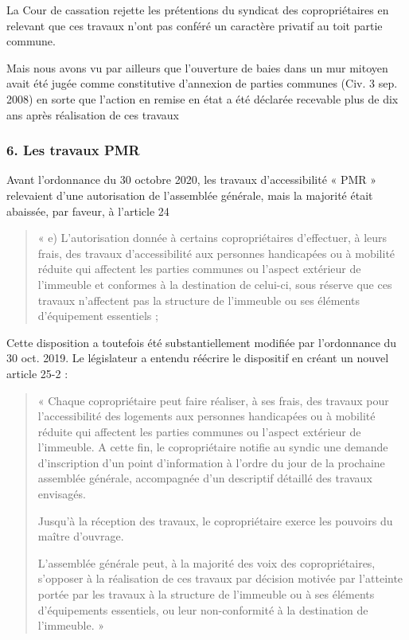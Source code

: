 				La Cour de cassation rejette les prétentions du syndicat des copropriétaires en relevant que ces travaux n’ont pas conféré un caractère privatif au toit partie commune.
				
				Mais nous avons vu par ailleurs que l’ouverture de baies dans un mur mitoyen avait été jugée comme constitutive d’annexion de parties communes (Civ. 3 sep. 2008) en sorte que l’action en remise en état a été déclarée recevable plus de dix ans après réalisation de ces travaux

		
		\subsubsection{6. Les travaux PMR}
		
			Avant l’ordonnance du 30 octobre 2020, les travaux d’accessibilité « PMR » relevaient d’une autorisation de l’assemblée générale, mais la majorité était abaissée, par faveur, à l’article 24
			\begin{quote}
				« e) L’autorisation donnée à certains copropriétaires d’effectuer, à leurs frais, des travaux d’accessibilité aux personnes handicapées ou à mobilité réduite qui affectent les parties communes ou l’aspect extérieur de l’immeuble et conformes à la destination de celui-ci, sous réserve que ces travaux n’affectent pas la structure de l’immeuble ou ses éléments d’équipement essentiels ;
			\end{quote}
			
			Cette disposition a toutefois été substantiellement modifiée par l’ordonnance du 30 oct. 2019. Le législateur a entendu réécrire le dispositif en créant un nouvel article 25-2 :
			\begin{quote}
				« Chaque copropriétaire peut faire réaliser, à ses frais, des travaux pour l'accessibilité des logements aux personnes handicapées ou à mobilité réduite qui affectent les parties communes ou l'aspect extérieur de l'immeuble. A cette fin, le copropriétaire notifie au syndic une demande d'inscription d'un point d'information à l'ordre du jour de la prochaine assemblée générale, accompagnée d'un descriptif détaillé des travaux envisagés.
				
				Jusqu'à la réception des travaux, le copropriétaire exerce les pouvoirs du maître d'ouvrage.
				
				L'assemblée générale peut, à la majorité des voix des copropriétaires, s'opposer à la réalisation de ces travaux par décision motivée par l'atteinte portée par les travaux à la structure de l'immeuble ou à ses éléments d'équipements essentiels, ou leur non-conformité à la destination de l'immeuble. »
			\end{quote}
			
